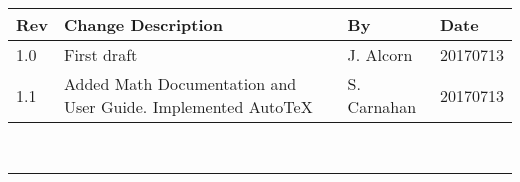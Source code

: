\documentclass[]{BasiliskReportMemo}
\begin{document}
\makeCover

%
%
\pagestyle{empty}
{\renewcommand{\arraystretch}{2}
	\noindent
	\begin{longtable}{|p{0.5in}|p{3.5in}|p{1.07in}|p{0.9in}|}
		\hline
		{\bfseries Rev} & {\bfseries Change Description} & {\bfseries By}& {\bfseries Date} \\
		\hline
		1.0 & First draft & J. Alcorn & 20170713 \\
		\hline
		1.1 & Added Math Documentation and User Guide. Implemented AutoTeX & S. Carnahan & 20170713 \\
		\hline
		
	\end{longtable}
}

\newpage
\setcounter{page}{1}
\pagestyle{fancy}

\tableofcontents %
~\\ \hrule ~\\ %
	








\end{document}
